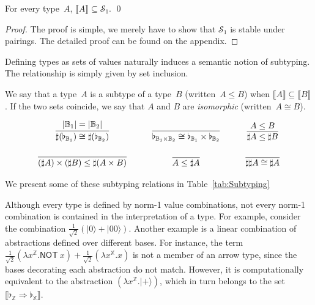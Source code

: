 \documentclass[a4paper,UKenglish,numberwithinsect,pdfa,anonymous]{lipics-v2021}
\theoremstyle{restatestyle}
\newcommand\ket[1]{\ensuremath{|#1\rangle}}
\def\Sph{\mathcal{S}_1}       %
\def\Lam#1#2#3{\lambda#1^{#2}{.}#3} %
\def\BB{\mathbb{B}}
\def\Arr{\Rightarrow}
\def\sem#1{\llbracket#1\rrbracket}
\newcommand\B{\mathbb Z}
\newcommand\XB{\mathbb X}
\newcommand{\pauliX}[1]{\mathsf{NOT}\ #1}
\newcommand\basis[1]{\ensuremath{\flat_{#1}}}
\begin{document}
\begin{theorem}\label{prop:UnitaryTypes}
  For every type~$A$, $\sem{A}\subseteq\Sph$.
  \qed
\end{theorem}
\begin{proof}
  The proof is simple, we merely have to show that $\Sph$ is stable under pairings. The detailed proof can be found on the appendix.
\end{proof}

Defining types as sets of values naturally induces a semantic notion of
subtyping. The relationship is simply given by set inclusion. 
\begin{definition}\label{def:Subtyping}
We say that a type~$A$ is a subtype of a type~$B$
(written~$A\leq B$) when $\sem A\subseteq\sem B$. 
If the two sets coincide, we say that $A$ and $B$ are \emph{isomorphic}
(written~$A\cong B$).
\end{definition}

\begin{table}[t]
  \centering
  \[
  \begin{array}{c@{\qquad\quad}c@{\qquad\quad}c}
    \infer{\sharp (\basis{\BB_1})\cong\sharp(\basis{\BB_2})}{|\BB_1| = |\BB_2|} &
    \infer{\basis{\BB_1\times \BB_2} \cong \basis{\BB_1}\times\basis{\BB_2}}{} &
    \infer{\sharp A \leq \sharp B}{A\leq B} \\[15pt]
    \infer{(\sharp A)\times(\sharp B)\leq\sharp(A\times B)}{}&
    {\infer{A\leq \sharp A}{}} &
    {\infer{\sharp\sharp A \cong \sharp A}{}}
  \end{array}
  \]
  \caption{Some valid subtyping rules.}
  \label{tab:Subtyping}
\end{table}

We present some of these subtyping relations in Table~\ref{tab:Subtyping}

Although every type is defined by norm-1 value combinations, not every
norm-1 combination is contained in the interpretation of a type.
For example, consider the combination
$\tfrac{1}{\sqrt{2}}(\ket{0} + \ket{00})$.
Another example is a linear combination of abstractions defined over different
bases. For instance, the term
\(
  \tfrac{1}{\sqrt{2}}(\Lam{x}{{\B}}{\pauliX{x}})
  + \tfrac{1}{\sqrt{2}}(\Lam{x}{{\XB}}{x})
\)
is not a member of an arrow type, since the bases decorating each abstraction
do not match. However, it is computationally equivalent to the abstraction
$(\Lam{x}{{\B}}{\ket{+}})$, which in turn belongs to the set
$\sem{\basis{\B}\Arr\basis{\XB}}$.
\end{document}
